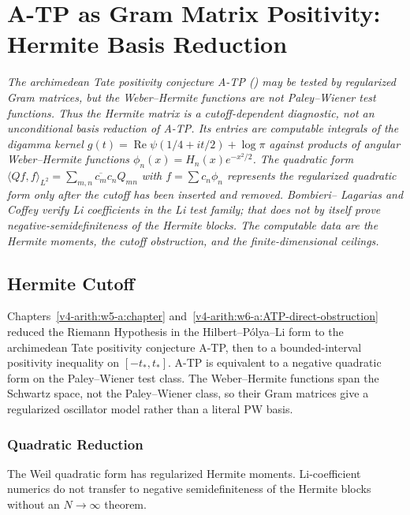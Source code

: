 \chapter{A-TP as Gram Matrix Positivity: Hermite Basis Reduction}
\label{v4-arith:w7-h:chapter}

\emph{The archimedean Tate positivity conjecture
A-TP () may be
tested by regularized Gram matrices, but the Weber--Hermite functions
are not Paley--Wiener test functions. Thus the Hermite matrix is a
cutoff-dependent diagnostic, not an unconditional basis reduction of
A-TP. Its entries are computable integrals of the digamma kernel
\(g(t)=\operatorname{Re}\psi(1/4+it/2)+\log\pi\) against products
of angular Weber--Hermite functions \(\phi_{n}(x)=H_{n}(x)e^{-x^{2}/2}\). The
quadratic form
\(\langle Qf,f\rangle_{L^{2}}=\sum_{m,n}\overline{c_{m}}c_{n}Q_{mn}\)
with \(f=\sum c_{n}\phi_{n}\) represents the regularized quadratic
form only after the cutoff has been inserted and removed. Bombieri--
Lagarias and Coffey verify Li coefficients in the Li test family; that
does not by itself prove negative-semidefiniteness of the Hermite
blocks. The computable data are the Hermite moments, the cutoff
obstruction, and the finite-dimensional ceilings.}

\section{Hermite Cutoff}
\label{v4-arith:w7-h:context}

Chapters~\ref{v4-arith:w5-a:chapter} and~\ref{v4-arith:w6-a:ATP-direct-obstruction}
reduced the Riemann Hypothesis in the Hilbert--P\'olya--Li form to the
archimedean Tate positivity conjecture A-TP, then to a bounded-interval
positivity inequality on \([-t_{\ast},t_{\ast}]\). A-TP is equivalent
to a negative quadratic form on the Paley--Wiener test class. The
Weber--Hermite functions span the Schwartz space, not the
Paley--Wiener class, so their Gram matrices give a regularized
oscillator model rather than a literal PW basis.

\subsection{Quadratic Reduction}
\label{v4-arith:w7-h:objective}

The Weil quadratic form has regularized Hermite moments. Li-coefficient
numerics do not transfer to negative semidefiniteness of the Hermite
blocks without an \(N\to\infty\) theorem.

